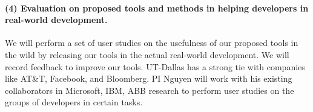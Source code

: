 \paragraph{\bf (4) Evaluation on proposed tools and methods in helping developers in real-world development.}

We will perform a set of user studies on the usefulness of our
proposed tools in the wild by releasing our
tools in the actual real-world development. 
We will record feedback to improve our tools.
UT-Dallas has a strong tie with companies like AT\&T, Facebook, and
Bloomberg. PI Nguyen will work with his existing collaborators in
Microsoft, IBM, ABB research to perform user studies on the groups of
developers in certain tasks.
